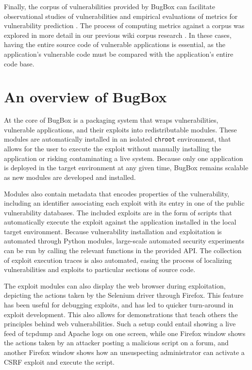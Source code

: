 \documentclass[letterpaper,twocolumn,10pt]{article}
\begin{document}
Finally, the corpus of vulnerabilities provided by BugBox can facilitate observational studies of vulnerabilities \cite{empiricalinvestigation} and empirical evaluations of metrics for vulnerability prediction \cite{evalcomplexityvul,metrisec2012surface}. The process of computing metrics against a corpus was explored in more detail in our previous wiki corpus research \cite{stuckman2011analyzing}. In these cases, having the entire source code of vulnerable applications is essential, as the application's vulnerable code must be compared with the application's entire code base.

\section{An overview of BugBox}

At the core of BugBox is a packaging system that wraps vulnerabilities, vulnerable applications, and their exploits into redistributable modules. These modules are automatically installed in an isolated \texttt{chroot} environment, that allows for the user to execute the exploit without manually installing the application or risking contaminating a live system. Because only one application is deployed in the target environment at any given time, BugBox remains scalable as new modules are developed and installed.

Modules also contain metadata that encodes properties of the vulnerability, including an identifier associating each exploit with its entry in one of the public vulnerability databases. The included exploits are in the form of scripts that automatically execute the exploit against the application installed in the local target environment. Because vulnerability installation and exploitation is automated through Python modules, large-scale automated security experiments can be run by calling the relevant functions in the provided API. The collection of exploit execution traces is also automated, easing the process of localizing vulnerabilities and exploits to particular sections of source code.

The exploit modules can also display the web browser during exploitation, depicting the actions taken by the Selenium driver through Firefox. This feature has been useful for debugging exploits, and has led to quicker turn-around in exploit development. This also allows for demonstrations that teach others the principles behind web vulnerabilities. Such a setup could entail showing a live feed of tcpdump and Apache logs on one screen, while one Firefox window shows the actions taken by an attacker posting a malicious script on a forum, and another Firefox window shows how an unsuspecting administrator can activate a CSRF exploit and execute the script. 
\end{document}
